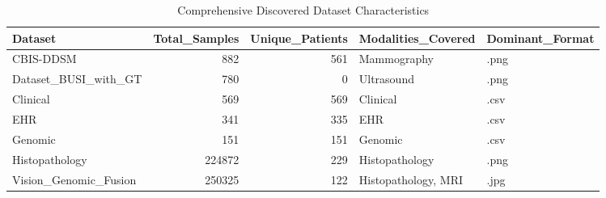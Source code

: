 \begin{table}
\caption{Comprehensive Discovered Dataset Characteristics}
\label{tab:table_dataset_statistics}
\begin{tabular}{lrrll}
\toprule
Dataset & Total\_Samples & Unique\_Patients & Modalities\_Covered & Dominant\_Format \\
\midrule
CBIS-DDSM & 882 & 561 & Mammography & .png \\
Dataset\_BUSI\_with\_GT & 780 & 0 & Ultrasound & .png \\
Clinical & 569 & 569 & Clinical & .csv \\
EHR & 341 & 335 & EHR & .csv \\
Genomic & 151 & 151 & Genomic & .csv \\
Histopathology & 224872 & 229 & Histopathology & .png \\
Vision\_Genomic\_Fusion & 250325 & 122 & Histopathology, MRI & .jpg \\
\bottomrule
\end{tabular}
\end{table}
